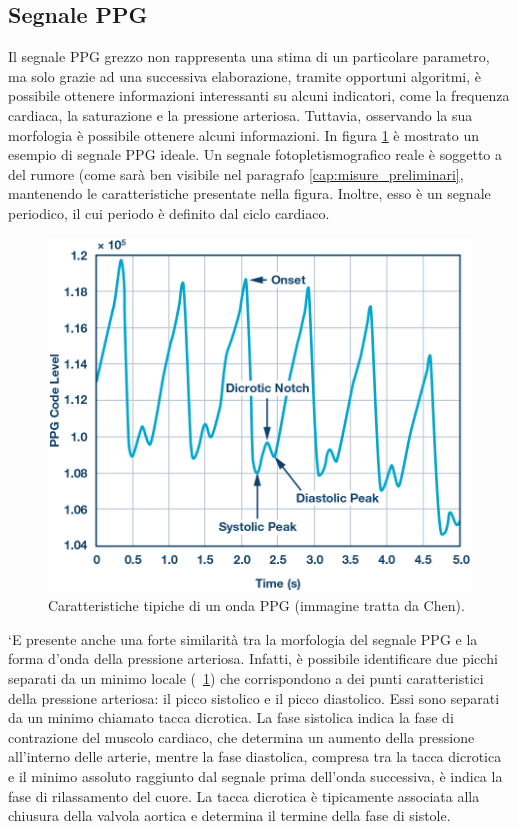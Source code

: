 \subsection{Segnale PPG}
Il segnale PPG grezzo non rappresenta una stima di un particolare parametro, ma solo grazie ad una successiva elaborazione, tramite opportuni algoritmi, è possibile ottenere informazioni interessanti su alcuni indicatori, come la frequenza cardiaca, la saturazione e la pressione arteriosa.
Tuttavia, osservando la sua morfologia è possibile ottenere alcuni informazioni\cite{Foroozan2018}. In figura \ref{fig:Descrizione_Segnale_PPG} è mostrato un esempio di segnale PPG ideale. Un segnale fotopletismografico reale è soggetto a del rumore (come sarà ben visibile nel paragrafo \ref{cap:misure_preliminari}, mantenendo le caratteristiche presentate nella figura. Inoltre, esso è un segnale periodico, il cui periodo è definito dal ciclo cardiaco.
\begin{figure}[h]
	\centering
	\includegraphics[width=0.7\linewidth]{ImageFiles/Misure Preliminari/descrizione_segnale_ppg}
	\caption{Caratteristiche tipiche di un onda PPG (immagine tratta da Chen\cite{Ppgsignal}).}
	\label{fig:Descrizione_Segnale_PPG}
\end{figure}
`E presente anche una forte similarità tra la morfologia del segnale PPG e la forma d'onda della pressione arteriosa. Infatti, è possibile identificare due picchi separati da un minimo locale (\Fig~\ref{fig:Descrizione_Segnale_PPG}) che corrispondono a dei punti caratteristici della pressione arteriosa: il picco sistolico e il picco diastolico. Essi sono separati da un minimo chiamato tacca dicrotica. La fase sistolica indica la fase di contrazione del muscolo cardiaco, che determina un aumento della pressione all'interno delle arterie, mentre la fase diastolica, compresa tra la tacca dicrotica e il minimo assoluto raggiunto dal segnale prima dell'onda successiva, è indica la fase di rilassamento del cuore\cite{Singh2017}. La tacca dicrotica è tipicamente associata alla chiusura della valvola aortica e determina il termine della fase di sistole\cite{Gamrah2020}.

